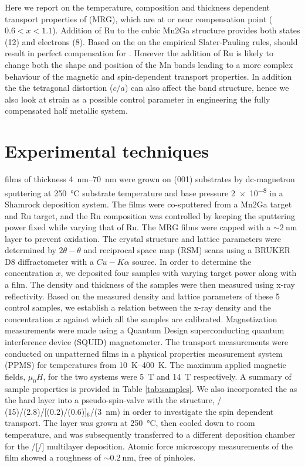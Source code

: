 \documentclass[reprint,aip,apl,floatfix,linenumbers,superscriptaddress]{revtex4-1}
\begin{document}
Here we report on the temperature, composition and thickness dependent transport properties of  (MRG), which are at or near compensation point ($0.6<x<1.1$). Addition of Ru to the cubic Mn2Ga structure provides both states (\num{12}) and electrons (\num{8}). Based on the on the empirical Slater-Pauling rules, should result in perfect compensation for . However the addition of Ru is likely to change both the shape and position of the Mn bands leading to a more complex behaviour of the magnetic and spin-dependent transport properties. In addition the the tetragonal distortion ($c/a$) can also affect the band structure, hence we also look at strain as a possible control parameter in engineering the  fully compensated half metallic system.


\section{Experimental techniques}
\label{sec:exp_tech}

 films of thickness \SIrange{4}{70}{\nano\metre} were grown on  (001) substrates by dc-magnetron sputtering at \SI{250}{\celsius} substrate temperature and base pressure \SI{2e-8}{\torr} in a Shamrock deposition system. The films were co-sputtered from a Mn2Ga target and Ru target, and the Ru composition was controlled by keeping the  sputtering power fixed while varying that of Ru. The MRG films were capped with a  $\sim \SI{2}{\nano\metre}$  layer to prevent oxidation.  The crystal structure and lattice parameters were determined by $2\theta-\theta$ and reciprocal space map (RSM) scans using a BRUKER D8 diffractometer with a $Cu-K\alpha$ source. In order to determine the  concentration $x$, we deposited four samples with varying  target power along with a  film. The density and thickness of the samples were then measured using x-ray reflectivity. Based on the measured density and lattice parameters of these 5 control samples, we establish a relation between the x-ray density and the  concentration $x$ against which all the samples are calibrated. Magnetization measurements were made using a Quantum Design superconducting quantum interference device (SQUID) magnetometer. The transport measurements were conducted on unpatterned  films in a physical properties measurement system (PPMS) for temperatures from \SIrange{10}{400}{\kelvin}. The maximum applied magnetic fields, $\mu_0H$, for the two systems were \SI{5}{\tesla} and \SI{14}{\tesla} respectively. A summary of sample properties is provided in Table \ref{tab:samples}. We also incorporated the  as the hard layer into a pseudo-spin-valve with the structure, / (15)/(2.8)/[(0.2)/(0.6)]$_6$/(\SI{3}{\nano\metre}) in order to investigate the spin dependent transport. The  layer was grown at \SI{250}{\celsius}, then cooled down to room temperature, and was subsequently transferred to a different deposition chamber for the /[/] multilayer deposition. Atomic force microscopy measurements of the  film showed a roughness of $\sim \SI{0.2}{\nano\metre}$, free of pinholes. 
\end{document}
